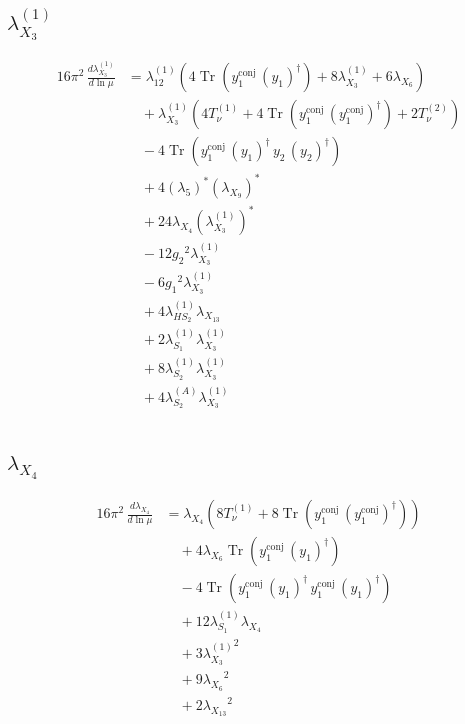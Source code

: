 \documentclass[10pt,a4paper]{article}
\begin{document}
\subsection*{$\lambda_{X_{3}}^{(1)}$}
\begin{align*}
16\pi^2\,\frac{d \lambda_{X_{3}}^{(1)}}{d\ln\mu} &={\lambda_{12}^{(1)}} (4 \operatorname{Tr}\!\left({y_{1}^{\mathrm{conj}}}\,\left({y_1}\right)^{\dagger}\right)+8 {\lambda_{X_{3}}^{(1)}}+6 {\lambda_{X_{6}}}) \\
&\quad +{\lambda_{X_{3}}^{(1)}} (4 T_{\nu}^{(1)}+4 \operatorname{Tr}\!\left({y_{1}^{\mathrm{conj}}}\,\left({y_{1}^{\mathrm{conj}}}\right)^{\dagger}\right)+2 T_{\nu}^{(2)}) \\
&\quad -4 \operatorname{Tr}\!\left({y_{1}^{\mathrm{conj}}}\,\left({y_1}\right)^{\dagger}\,{y_2}\,\left({y_2}\right)^{\dagger}\right) \\
&\quad +4 \left({\lambda_5}\right)^{*} \left({\lambda_{X_{9}}}\right)^{*} \\
&\quad +24 {\lambda_{X_{4}}} \left({\lambda_{X_{3}}^{(1)}}\right)^{*} \\
&\quad -12 {g_2}^2 {\lambda_{X_{3}}^{(1)}} \\
&\quad -6 {g_1}^2 {\lambda_{X_{3}}^{(1)}} \\
&\quad +4 {\lambda_{HS_2}^{(1)}} {\lambda_{X_{13}}} \\
&\quad +2 {\lambda_{S_1}^{(1)}} {\lambda_{X_{3}}^{(1)}} \\
&\quad +8 {\lambda_{S_2}^{(1)}} {\lambda_{X_{3}}^{(1)}} \\
&\quad +4 {\lambda_{S_2}^{(A)}} {\lambda_{X_{3}}^{(1)}} \\
\end{align*}
\subsection*{$\lambda_{X_{4}}$}
\begin{align*}
16\pi^2\,\frac{d \lambda_{X_{4}}}{d\ln\mu} &={\lambda_{X_{4}}} (8 T_{\nu}^{(1)}+8 \operatorname{Tr}\!\left({y_{1}^{\mathrm{conj}}}\,\left({y_{1}^{\mathrm{conj}}}\right)^{\dagger}\right)) \\
&\quad +4 {\lambda_{X_{6}}} \operatorname{Tr}\!\left({y_{1}^{\mathrm{conj}}}\,\left({y_1}\right)^{\dagger}\right) \\
&\quad -4 \operatorname{Tr}\!\left({y_{1}^{\mathrm{conj}}}\,\left({y_1}\right)^{\dagger}\,{y_{1}^{\mathrm{conj}}}\,\left({y_1}\right)^{\dagger}\right) \\
&\quad +12 {\lambda_{S_1}^{(1)}} {\lambda_{X_{4}}} \\
&\quad +3 {\lambda_{X_{3}}^{(1)}}^2 \\
&\quad +9 {\lambda_{X_{6}}}^2 \\
&\quad +2 {\lambda_{X_{13}}}^2 \\
\end{align*}
\end{document}
